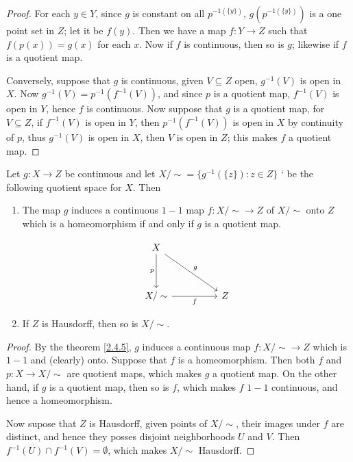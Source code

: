 \begin{proof}
    For each $y \in Y$, since  $g$ is constant on all  $p^{-1(\{y\})}$, $g(p^{-1(\{y\})})$ is a one
    point set in $Z$; let it be $f(y)$. Then we have a map $f:Y \rightarrow Z$ such that
    $f(p(x))=g(x)$ for each $x$. Now if  $f$ is continuous, then so is  $g$; likewise if  $f$ is a
    quotient map.

    Conversely, suppose that  $g$ is continuous, given  $V \subseteq Z$ open,  $g^{-1}(V)$ is open
    in $X$. Now  $g^{-1}(V)=p^{-1}(f^{-1}(V))$, and since $p$ is a quotient map,  $f^{-1}(V)$ is
    open in $Y$, hence  $f$ is continuous. Now suppose that  $g$ is a quotient map, for  $V
    \subseteq Z$, if  $f^{-1}(V)$ is open in $Y$, then  $p^{-1}(f^{-1}(V))$ is open in $X$ by
    continuity of  $p$, thus  $g^{-1}(V)$ is open in $X$, then  $V$ is open in  $Z$; this makes  $f$
    a quotient map.
\end{proof}
\begin{corollary}
    Let $g:X \rightarrow Z$ be continuous and let $X/\sim=\{g^{-1}(\{z\}):z \in Z\}$ ` be the
    following quotient space for $X$. Then
        \begin{enumerate}[label=(\arabic*)]
            \item The map $g$ induces a continuous  $1-1$ map  $f:X/\sim \rightarrow Z$ of  $X/\sim$
                onto  $Z$ which is a homeomorphism if and only if $g$ is a quotient map.

                \[\begin{tikzcd}
	                X \\
	                \\
	                {X/\sim} && Z
	                \arrow["p"', from=1-1, to=3-1]
	                \arrow["f"', from=3-1, to=3-3]
	                \arrow["g", from=1-1, to=3-3]
                    \end{tikzcd}\]

            \item If $Z$ is Hausdorff, then so is  $X/\sim$.
        \end{enumerate}
\end{corollary}
\begin{proof}
    By the theorem \ref{2.4.5}, $g$ induces a continuous map  $f:X/\sim \rightarrow Z$ which is
    $1-1$ and  (clearly) onto. Suppose that $f$ is a homeomorphism. Then both  $f$ and  $p:X
    \rightarrow X/\sim$ are quotient maps, which makes  $g$ a quotient map. On the other hand, if
    $g$ is a quotient map, then so is  $f$, which makes  $f$  $1-1$ continuous, and hence a
    homeomorphism.

    Now supose that  $Z$ is Hausdorff, given points of  $X/\sim$, their images under  $f$ are
    distinct, and hence they posses disjoint neighborhoods  $U$ and  $V$. Then  $f^{-1}(U) \cap
    f^{-1}(V)=\emptyset$, which makes $X/\sim$ Hausdorff.
\end{proof}


